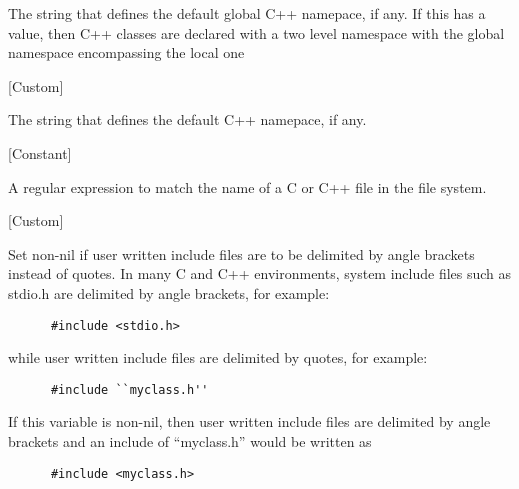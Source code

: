 \begin{doc-string}
The string that defines the default global C++ namepace, if any.
If this has a value, then C++ classes are declared with a two level
namespace with the global namespace encompassing the local one
\end{doc-string}

\vspace{1em}
\noindent
{}
\usebox{\funcname}
 \hfill [Custom]

\begin{doc-string}
The string that defines the default C++ namepace, if any.
\end{doc-string}

\vspace{1em}
\noindent
{}
\usebox{\funcname}
 \hfill [Constant]

\begin{doc-string}
A regular expression to match the name of a C or C++ file in the file system.
\end{doc-string}

\vspace{1em}
\noindent
{}
\usebox{\funcname}
 \hfill [Custom]

\begin{doc-string}
Set non-nil if user written include files are to be delimited by
angle brackets instead of quotes.
In many C and C++ environments, system include files such as stdio.h are delimited
by angle brackets, for example:

\small{\begin{verbatim}
      #include <stdio.h>
\end{verbatim}}

while user written include files are delimited by quotes, for example:

\small{\begin{verbatim}
      #include ``myclass.h''
\end{verbatim}}

If this variable is non-nil, then user written include files are delimited
by angle brackets and an include of ``myclass.h'' would be written as

\small{\begin{verbatim}
      #include <myclass.h>
\end{verbatim}}
\end{doc-string}

